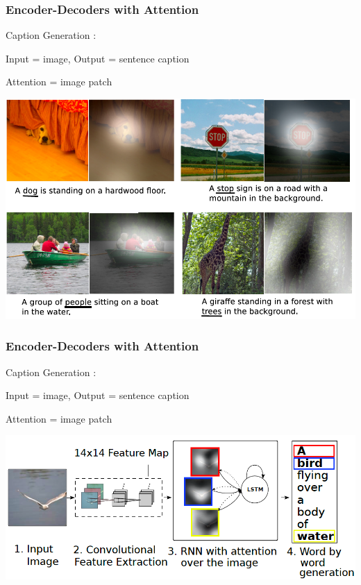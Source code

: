 \begin{frame}
\frametitle{Encoder-Decoders with Attention}
Caption Generation \cite{xu15caption}: 
\bi
\item Input = image, Output = sentence caption
\item Attention = image patch
\ei
\centerline{\includegraphics[scale=0.3]{figs/xu15_example}}
\end{frame}

\begin{frame}
\frametitle{Encoder-Decoders with Attention}
Caption Generation \cite{xu15caption}:
\bi
\item Input = image, Output = sentence caption
\item Attention = image patch
\ei
\centerline{\includegraphics[scale=0.3]{figs/xu15_model}}
\end{frame}

